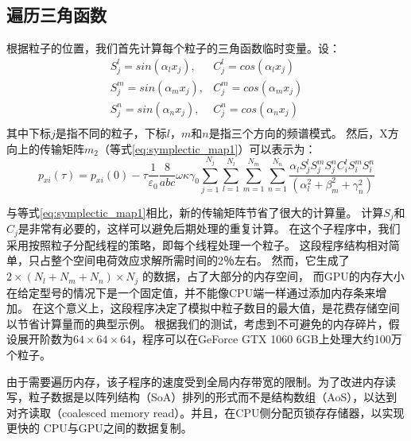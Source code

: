 \subsection{遍历三角函数}
根据粒子的位置，我们首先计算每个粒子的三角函数临时变量。设：
\begin{equation}
\begin{array}{cc}
    S^{l}_j =sin(\alpha_l x_j), & C^{l}_j =cos(\alpha_l x_j)  \\
    S^{m}_j =sin(\alpha_m x_j), & C^{m}_j =cos(\alpha_m x_j)  \\
    S^{n}_j =sin(\alpha_n x_j), & C^{n}_j =cos(\alpha_n x_j)  \\
\end{array}
\end{equation}
其中下标$j$是指不同的粒子，下标$l$，$m$和$n$是指三个方向的频谱模式。
然后，X方向上的传输矩阵$m_2$（等式\ref{eq:symplectic_map1}）可以表示为：
\begin{equation}\label{eq:symplectic_map2}
{{p}_{xi}}(\tau )={{p}_{xi}}(0)-\tau \frac{1}{{{\varepsilon }_{0}}}\frac{8}{abc}\omega \kappa {{\gamma }_{0}}\sum\limits_{j=1}^{{{N}_{j}}}{\sum\limits_{l=1}^{{{N}_{l}}}{\sum\limits_{m=1}^{{{N}_{m}}}{\sum\limits_{n=1}^{{{N}_{n}}}{\frac{{{\alpha }_{l}}S_{j}^{l}S_{j}^{m}S_{j}^{n}C_{i}^{l}S_{i}^{m}S_{i}^{n}}{(\alpha _{l}^{2}+\beta _{m}^{2}+\gamma _{n}^{2})}}}}}
\end{equation}

与等式\ref{eq:symplectic_map1}相比，新的传输矩阵节省了很大的计算量。
计算$S_ {j} $和$C_ {j}$是非常有必要的，这样可以避免后期处理的重复计算。
在这个子程序中，我们采用按照粒子分配线程的策略，即每个线程处理一个粒子。
这段程序结构相对简单，只占整个空间电荷效应求解所需时间的2％左右。
然而，它生成了$ 2 \times({{N}_{l}} + {{N}_{m}} + {{N}_{n}})\times {{N} _ {j}} $ 的数据，占了大部分的内存空间，
而GPU的内存大小在给定型号的情况下是一个固定值，并不能像CPU端一样通过添加内存条来增加。
在这个意义上，这段程序决定了模拟中粒子数目的最大值，是花费存储空间以节省计算量而的典型示例。
根据我们的测试，考虑到不可避免的内存碎片，假设展开阶数为$64\times64\times64$，程序可以在GeForce GTX 1060 6GB上处理大约100万个粒子。

由于需要遍历内存，该子程序的速度受到全局内存带宽的限制。为了改进内存读写，粒子数据是以阵列结构（SoA）排列的形式而不是结构数组（AoS），以达到对齐读取（coalesced memory read）。并且，在CPU侧分配页锁存存储器，以实现更快的 CPU与GPU之间的数据复制。

